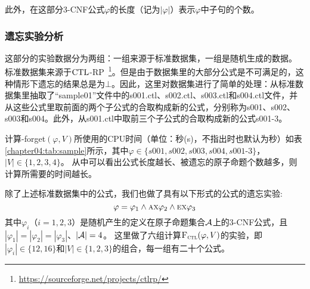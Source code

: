 	此外，在这部分3-CNF公式$\varphi$的长度（记为$|\varphi|$）表示$\varphi$中子句的个数。

\subsubsection{遗忘实验分析}
这部分的实验数据分为两组：一组来源于标准数据集，一组是随机生成的数据。
标准数据集来源于$\textrm{CTL}$-RP~\footnote{\url{https://sourceforge.net/projects/ctlrp/}}。但是由于数据集里的大部分公式是不可满足的，这种情形下遗忘的结果总是为$\bot$。因此，这里对数据集进行了简单的处理：从标准数据集里抽取了“sample01”文件中的s001.ctl、s002.ctl、s003.ctl和s004.ctl文件，并从这些公式里取前面的两个子公式的合取构成新的公式，分别称为s001、s002、s003和s004。此外，从s001.ctl中取前三个子公式的合取构成新的公式s001-3。

计算{\CTL-forget}$(\varphi, V)$所使用的CPU时间（单位：秒(s)，不指出时也默认为秒）如表\ref{chapter04:tab:sample}所示，其中$\varphi\in \{s001,s002,s003,s004,s001$-$3\}$，$|V|\in \{1,2,3,4\}$。
从中可以看出公式长度越长、被遗忘的原子命题个数越多，则计算所需要的时间越长。

\begin{table}%
	\small
	\centering
	\caption{计算 {\CTL-forget}$(\varphi, V)$所使用的CPU时间（单位：秒(s)）}\label{chapter04:tab:sample}
\end{table}

除了上述标准数据集中的公式，我们也做了具有以下形式的公式的遗忘实验:
$$\varphi=\varphi_1 \wedge \textsc{a}\textsc{x} \varphi_2 \wedge \textsc{e}\textsc{x} \varphi_3$$
其中$\varphi_i$（$i=1,2,3$）是随机产生的定义在原子命题集合${\cal A}$上的3-CNF公式，且$|\varphi_1| = |\varphi_2| =|\varphi_3|$、$|{\cal A}|=4$。
这里做了六组计算${\textsc{F}_{\textsc{ctl}}}(\varphi,V)$的实验，即$|\varphi_i| \in \{12,16\}$和$|V|\in \{1,2,3\}$的组合，每一组有二十个公式。

